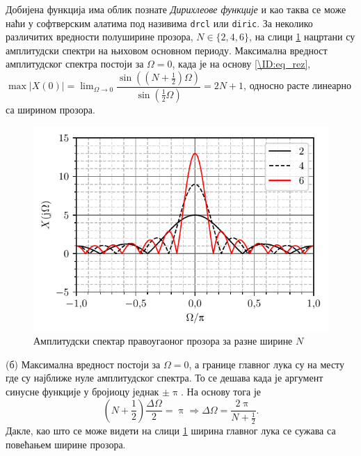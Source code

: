 Добијена функција има облик познате \textit{Дирихлеове функције} и као таква се може наћи у софтверским  
алатима под називима \texttt{drcl} или \texttt{diric}. За неколико различитих вредности полуширине прозора, 
$N \in \{2,4,6\}$, на слици \ref{fig:\ID.varn} нацртани су амплитудски спектри на њиховом 
основном периоду. Максимална вредност амплитудског спектра постоји за $\Omega = 0$, када је на 
основу \eqref{\ID:eq_rez}, 
$\max |X(0)| = \lim_{\Omega \to 0}  \dfrac{\sin \left( \left(N + \frac12\right) \Omega \right) }{ \sin \left(  \frac12 \Omega \right)} 
= 2N + 1$, односно расте линеарно са ширином прозора.
\begin{figure}
    \centering
    \includegraphics{fig/rec_spect_varn.pdf}
    \caption{Амплитудски спектар правоугаоног прозора за разне ширине $N$}
    \label{fig:\ID.varn}
\end{figure}

(б) Максимална вредност постоји за $\Omega = 0$, а границе главног лука су на месту где су најближе 
нуле амплитудског спектра. То се дешава када је аргумент синусне функције у бројиоцу једнак $\pm \uppi$. 
На основу тога је 
\begin{equation}
    \left( N + \dfrac{1}{2} \right) \dfrac{\Delta \Omega}{2} = \uppi 
    \Rightarrow
    \Delta \Omega = \dfrac{2 \uppi}{N + \frac{1}{2}}.
\end{equation}
Дакле, као што се може видети на слици \ref{fig:\ID.varn} ширина главног лука се сужава са повећањем ширине прозора. \\